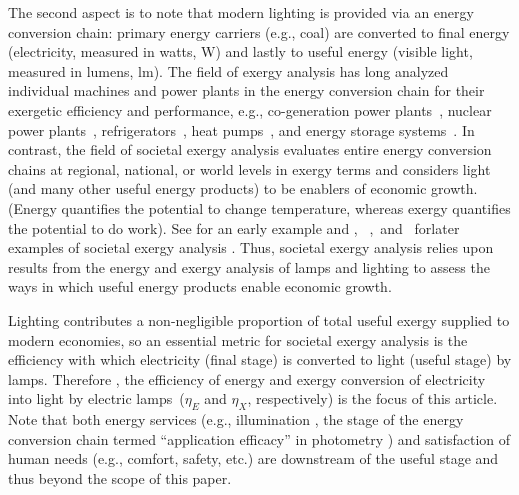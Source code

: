 \documentclass[energies,article,accept,moreauthors,pdftex]{Definitions/mdpi}\usepackage[]{graphicx}\usepackage[]{color}
\newcommand{\ins}[1]{#1}
\newcommand{\rev}[2]{#2}
\providecommand{\DIFaddbegin}{} %
\providecommand{\DIFaddend}{} %
\providecommand{\DIFdelbegin}{} %
\providecommand{\DIFdelend}{} %
\newcommand{\DIFscaledelfig}{0.5}
\newlength{\DIFdelgraphicswidth} %
\newlength{\DIFdelgraphicsheight} %
\newcommand{\DIFaddincludegraphics}[2][]{{\color{blue}\fbox{\DIFOincludegraphics[#1]{#2}}}} %
\newcommand{\DIFdelincludegraphics}[2][]{%
\sbox{\DIFdelgraphicsbox}{\DIFOincludegraphics[#1]{#2}}%
\settoboxwidth{\DIFdelgraphicswidth}{\DIFdelgraphicsbox} %
\settoboxtotalheight{\DIFdelgraphicsheight}{\DIFdelgraphicsbox} %
\scalebox{\DIFscaledelfig}{%
\parbox[b]{\DIFdelgraphicswidth}{\usebox{\DIFdelgraphicsbox}\\[-\baselineskip] \rule{\DIFdelgraphicswidth}{0em}}\llap{\resizebox{\DIFdelgraphicswidth}{\DIFdelgraphicsheight}{%
\setlength{\unitlength}{\DIFdelgraphicswidth}%
\begin{picture}(1,1)%
\thicklines\linethickness{2pt} %
{\color[rgb]{1,0,0}\put(0,0){\framebox(1,1){}}}%
{\color[rgb]{1,0,0}\put(0,0){\line( 1,1){1}}}%
{\color[rgb]{1,0,0}\put(0,1){\line(1,-1){1}}}%
\end{picture}%
}\hspace*{3pt}}} %
} %
\DeclareRobustCommand{\DIFaddbegin}{\DIFOaddbegin \let\includegraphics\DIFaddincludegraphics} %
\DeclareRobustCommand{\DIFaddend}{\DIFOaddend \let\includegraphics\DIFOincludegraphics} %
\DeclareRobustCommand{\DIFdelbegin}{\DIFOdelbegin \let\includegraphics\DIFdelincludegraphics} %
\DeclareRobustCommand{\DIFdelend}{\DIFOaddend \let\includegraphics\DIFOincludegraphics} %
\begin{document}
The second aspect is to note that 
modern lighting is provided via an energy conversion chain:
primary energy \DIFaddbegin \ins{carriers} \DIFaddend (e.g., coal) \DIFdelbegin \DIFdelend \DIFaddbegin {are} \DIFaddend converted to
final energy (electricity, measured in watts, W) and lastly to
useful energy (visible light, measured in lumens, lm).
\DIFdelbegin \DIFdelend \DIFaddbegin \ins{The field of exergy analysis has long analyzed individual machines
and power plants in the energy conversion chain 
for their exergetic efficiency and performance, e.g.,
co-generation power plants~\cite{Bejan:1996},
nuclear power plants~\cite{Durmayaz:2001}, 
refrigerators~\cite{joybari2013exergy},
heat pumps~\cite{bobbo2019energetic}, and 
energy storage systems~\cite{zwierzchowski2020energy}.
In contrast,} the  field of societal exergy analysis evaluates entire energy conversion chains
at regional, national, or world levels in exergy terms and
considers light (and many other useful energy products)
to be enablers of economic growth.
(Energy quantifies the potential to change temperature,
whereas exergy quantifies the potential to do work).
 See \citet{Nakicenovic1996} for an early example and
\ins{\citet{Guevara:2016a},}
\mbox{%
\citet{Heun:2019aa}, and \citet{Ver-Beek:2020aa}} forlater examples
 of societal exergy analysis%
.
Thus, societal exergy analysis 
relies upon results from the energy and exergy analysis of 
lamps and lighting to assess the ways in which useful energy products 
enable economic growth.


Lighting contributes a non-negligible proportion of total useful exergy
supplied to modern economies, so
an essential metric for societal exergy analysis
is the efficiency with which
electricity (final stage) is converted to light (useful stage) by lamps.
Therefore , the efficiency of energy and exergy conversion of electricity
into light by electric lamps~($\eta_E$ and $\eta_X$, respectively)
is the focus of this article.
Note that both energy services (e.g., illumination\DIFdelbegin %
, the stage of the energy conversion chain
termed ``application efficacy'' in photometry 
\cite{rea2001application}) 
and satisfaction of human needs
(e.g., comfort, safety, etc.) are downstream of the useful stage 
and thus \DIFdelbegin %
{beyond the scope of this paper}.
\end{document}
